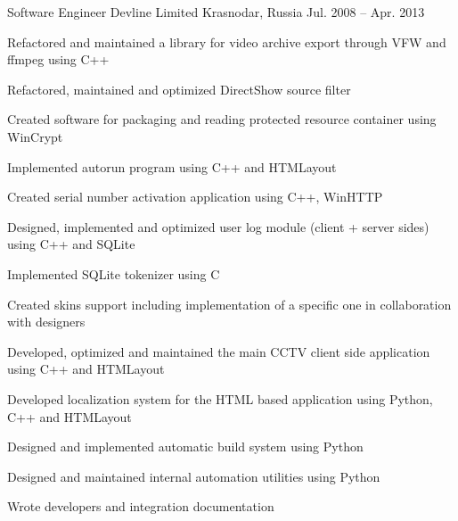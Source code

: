 \begin{cventries}
  \cventry
    {Software Engineer} %
    {Devline Limited} %
    {Krasnodar, Russia} %
    {Jul. 2008 -- Apr. 2013} %
    {
      \begin{cvitems} %
        \item {Refactored and maintained a library for video archive export through VFW and ffmpeg using C++}
        \item {Refactored, maintained and optimized DirectShow source filter}
        \item {Created software for packaging and reading protected resource container using WinCrypt}
        \item {Implemented autorun program using C++ and HTMLayout}
        \item {Created serial number activation application using C++, WinHTTP}
        \item {Designed, implemented and optimized user log module (client + server sides) using C++ and SQLite}
        \item {Implemented SQLite tokenizer using C}
        \item {Created skins support including implementation of a specific one in collaboration with designers}
        \item {Developed, optimized and maintained the main CCTV client side application using C++ and HTMLayout}
        \item {Developed localization system for the HTML based application using Python, C++ and HTMLayout}
        \item {Designed and implemented automatic build system using Python}
        \item {Designed and maintained internal automation utilities using Python}
        \item {Wrote developers and integration documentation}
      \end{cvitems}
    }

\end{cventries}
